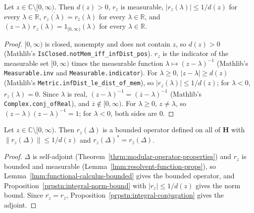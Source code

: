 \begin{lemma}
    \label{lmm:resolvent-function-props}
    \leanok
    Let $z \in \mathbb{C} \setminus [0, \infty)$. Then $d(z) > 0$, $r_z$ is measurable, $|r_z(\lambda)| \le 1/d(z)$ for every $\lambda \in \mathbb{R}$, $\overline{r_z(\lambda)} = r_{\overline{z}}(\lambda)$ for every $\lambda \in \mathbb{R}$, and $(z - \lambda)\,r_z(\lambda) = 1_{[0, \infty)}(\lambda)$ for every $\lambda \in \mathbb{R}$.
\end{lemma}
\begin{proof}
    \leanok
    $[0, \infty)$ is closed, nonempty and does not contain $z$, so $d(z) > 0$ (Mathlib's \texttt{IsClosed.notMem\_iff\_infDist\_pos}). $r_z$ is the indicator of the measurable set $[0, \infty)$ times the measurable function $\lambda \mapsto (z - \lambda)^{-1}$ (Mathlib's \texttt{Measurable.inv} and \texttt{Measurable.indicator}). For $\lambda \ge 0$, $|z - \lambda| \ge d(z)$ (Mathlib's \texttt{Metric.infDist\_le\_dist\_of\_mem}), so $|r_z(\lambda)| \le 1/d(z)$; for $\lambda < 0$, $r_z(\lambda) = 0$. Since $\lambda$ is real, $\overline{(z - \lambda)^{-1}} = (\overline{z} - \lambda)^{-1}$ (Mathlib's \texttt{Complex.conj\_ofReal}), and $\overline{z} \notin [0, \infty)$. For $\lambda \ge 0$, $z \ne \lambda$, so $(z - \lambda)(z - \lambda)^{-1} = 1$; for $\lambda < 0$, both sides are $0$.
\end{proof}

\begin{lemma}
    \label{lmm:modular-resolvent-bounded}
    \leanok
    Let $z \in \mathbb{C} \setminus [0, \infty)$. Then $r_z(\Delta)$ is a bounded operator defined on all of $\mathbf{H}$ with $\|r_z(\Delta)\| \le 1/d(z)$ and $r_z(\Delta)^* = r_{\overline{z}}(\Delta)$.
\end{lemma}
\begin{proof}
    \leanok
    $\Delta$ is self-adjoint (Theorem~\ref{thrm:modular-operator-properties}) and $r_z$ is bounded and measurable (Lemma~\ref{lmm:resolvent-function-props}), so Lemma~\ref{lmm:functional-calculus-bounded} gives the bounded operator, and Proposition~\ref{prpstn:integral-norm-bound} with $|r_z| \le 1/d(z)$ gives the norm bound. Since $\overline{r_z} = r_{\overline{z}}$, Proposition~\ref{prpstn:integral-conjugation} gives the adjoint.
\end{proof}


